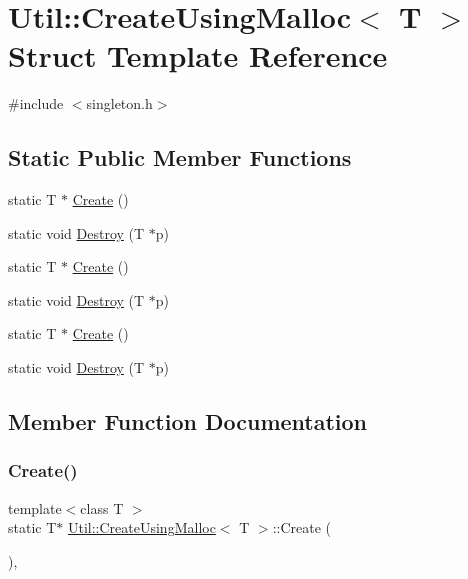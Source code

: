 \hypertarget{structUtil_1_1CreateUsingMalloc}{}\section{Util\+:\+:Create\+Using\+Malloc$<$ T $>$ Struct Template Reference}
\label{structUtil_1_1CreateUsingMalloc}


{\ttfamily \#include $<$singleton.\+h$>$}

\subsection*{Static Public Member Functions}
\begin{DoxyCompactItemize}
\item 
static T $\ast$ \mbox{\hyperlink{structUtil_1_1CreateUsingMalloc_a920efcae7cd097b71fdbc2662c47631f}{Create}} ()
\item 
static void \mbox{\hyperlink{structUtil_1_1CreateUsingMalloc_a8197e99b6560b6b6ee323ec3176698f8}{Destroy}} (T $\ast$p)
\item 
static T $\ast$ \mbox{\hyperlink{structUtil_1_1CreateUsingMalloc_a920efcae7cd097b71fdbc2662c47631f}{Create}} ()
\item 
static void \mbox{\hyperlink{structUtil_1_1CreateUsingMalloc_a8197e99b6560b6b6ee323ec3176698f8}{Destroy}} (T $\ast$p)
\item 
static T $\ast$ \mbox{\hyperlink{structUtil_1_1CreateUsingMalloc_a920efcae7cd097b71fdbc2662c47631f}{Create}} ()
\item 
static void \mbox{\hyperlink{structUtil_1_1CreateUsingMalloc_a8197e99b6560b6b6ee323ec3176698f8}{Destroy}} (T $\ast$p)
\end{DoxyCompactItemize}


\subsection{Member Function Documentation}
\mbox{\label{structUtil_1_1CreateUsingMalloc_a920efcae7cd097b71fdbc2662c47631f}} 
\subsubsection{\texorpdfstring{Create()}{Create()}\hspace{0.1cm}{\footnotesize\ttfamily [1/3]}}
{\footnotesize\ttfamily template$<$class T $>$ \\
static T$\ast$ \mbox{\hyperlink{structUtil_1_1CreateUsingMalloc}{Util\+::\+Create\+Using\+Malloc}}$<$ T $>$\+::Create (\begin{DoxyParamCaption}{ }\end{DoxyParamCaption})\hspace{0.3cm}{\ttfamily [inline]}, {\ttfamily [static]}}

